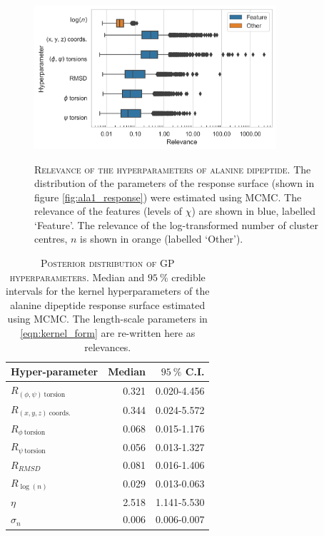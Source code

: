 \begin{figure}
    \centering
    \caption[Relevance of the hyperparameters of alanine dipeptide]{\textsc{Relevance of the hyperparameters of alanine dipeptide}. The distribution of the parameters of the response surface (shown in figure \ref{fig:ala1_response}) were estimated using MCMC. The relevance of the features (levels of $\chi$) are shown in blue, labelled `Feature'. The relevance of the log-transformed number of cluster centres, $n$ is shown in orange (labelled `Other').}
    \includegraphics[width=0.8\textwidth]{chapters/msm_optimization/figures/ala1_relevance.png}
    \label{fig:ala1_relevance}
\end{figure}

\begin{table}
    \centering
    \caption[Posterior distribution of GP hyperparameters]{\textsc{Posterior distribution of GP hyperparameters}. Median and $\SI{95}{\percent}$ credible intervals for the kernel hyperparameters of the alanine dipeptide response surface estimated using MCMC. The length-scale parameters in \ref{eqn:kernel_form} are re-written here as relevances.}
    \begin{tabular}{lrr}
    \toprule
                          Hyper-parameter &    Median & $\SI{95}{\percent}$ C.I. \\
    \midrule
     $R_{(\phi, \psi)\ \mathrm{torsion}}$ &  0.321 & 0.020-4.456 \\
        $R_{(x, y, z)\ \mathrm{coords.}}$ &  0.344 & 0.024-5.572 \\
             $R_{\phi\ \mathrm{torsion}}$ &  0.068 & 0.015-1.176 \\
             $R_{\psi\ \mathrm{torsion}}$ &  0.056 & 0.013-1.327 \\
                               $R_{RMSD}$ &  0.081 & 0.016-1.406 \\
                          $R_{\log{(n)}}$ &  0.029 & 0.013-0.063 \\
                                   $\eta$ &  2.518 & 1.141-5.530 \\
                               $\sigma_n$ &  0.006 & 0.006-0.007 \\
    \bottomrule
    \end{tabular}
    \label{tab:ala1_rel_post}
\end{table}

